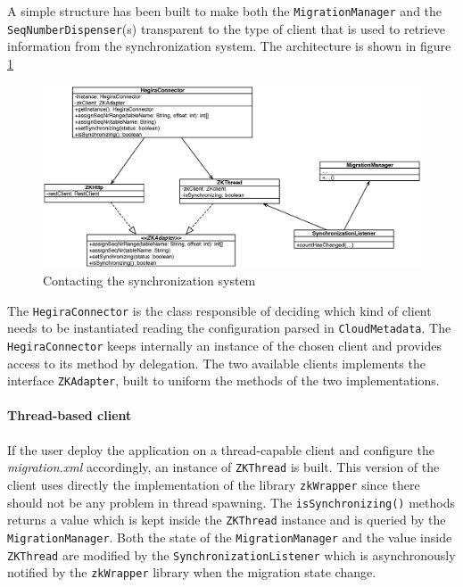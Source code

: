 \newparagraph A simple structure has been built to make both the \texttt{MigrationManager} and the \texttt{SeqNumberDispenser}(s) transparent to the type of client that is used to retrieve information from the synchronization system. The architecture is shown in figure \ref{fig:zk-adapter}

\begin{figure}[tbh]
  \centering
  \includegraphics[width=14cm]{images/zk_adapter}
  \caption{Contacting the synchronization system}
  \label{fig:zk-adapter}
\end{figure} 

\noindent The \texttt{HegiraConnector} is the class responsible of deciding which kind of client needs to be instantiated reading the configuration parsed  in \texttt{CloudMetadata}. The \texttt{HegiraConnector}  keeps internally an instance of the chosen client and provides access to its method by delegation.
The two available clients implements the interface \texttt{ZKAdapter}, built to uniform the methods of the two implementations.

\paragraph{Thread-based client} If the user deploy the application on a thread-capable client and configure the \textit{migration.xml} accordingly, an instance of \texttt{ZKThread} is built. This version of the client uses directly the implementation of the library \texttt{zkWrapper} since there should not be any problem in thread spawning.
The \texttt{isSynchronizing()} methods returns a value which is kept inside the \texttt{ZKThread} instance and is queried by the \texttt{MigrationManager}.
Both the state of the \texttt{MigrationManager} and the value inside \texttt{ZKThread} are modified by the \texttt{SynchronizationListener} which is asynchronously notified by the \texttt{zkWrapper} library when the migration state change.

